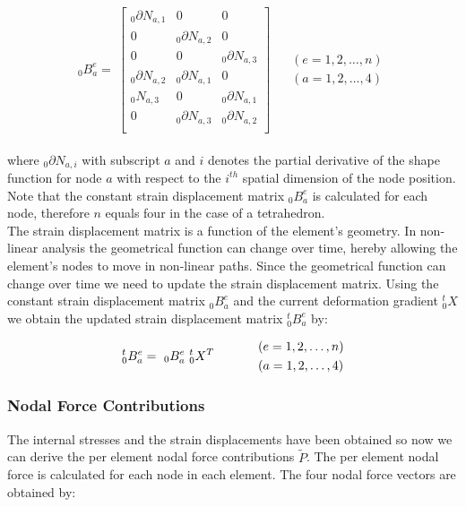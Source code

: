 \begin{equation}
_0B^{e}_{a} = \
\begin{bmatrix} 
  _0\partial N_{a,1} & 0 & 0 \\
  0 & _0\partial N_{a,2} & 0 \\
  0 & 0 & _0\partial N_{a,3} \\
  _0\partial N_{a,2} & _0\partial N_{a,1} & 0 \\
  _0N_{a,3} & 0 & _0\partial N_{a,1} \\
  0 & _0\partial N_{a,3} & _0\partial N_{a,2} \\
\end{bmatrix} 
\begin{aligned}
\ \ &(e = 1,2,\dots,n) \\
\ \ &(a = 1,2,\dots,4)
\end{aligned}
\end{equation} \\

where $_0\partial N_{a,i}$ with subscript $a$ and $i$ denotes the partial
derivative of the shape function for node $a$ with respect to the
$i^{th}$ spatial dimension of the node position. Note
that the constant strain displacement matrix $_0B^{e}_{a}$ is
calculated for each node, therefore $n$ equals four in the case of
a tetrahedron.\\  

The strain displacement matrix is a function of the element's geometry. In
non-linear analysis the geometrical function can change over time,
hereby allowing the element's nodes to move in non-linear paths.
Since the geometrical function can change over time we need to update
the strain displacement matrix. Using the constant strain displacement
matrix $_0B^{e}_{a}$ and the current deformation gradient
$^t_0X$ we obtain the updated strain displacement matrix
$^t_0B^{e}_{a}$ by:

\begin{equation}
\label{eq:strain-displacement-updated}
^t_0B^{e}_{a} = \ _0B^{e}_{a} \ ^t_0X^T
\hspace{10mm}
\begin{aligned}
\ \ &(e = 1,2,\dots,n) \\
\ \ &(a = 1,2,\dots,4)
\end{aligned}
\end{equation}

\subsubsection*{Nodal Force Contributions}
\label{sec:nodal_force_contributions}
The internal stresses and the strain displacements have been obtained so
now we can derive the per element nodal force contributions
$\tilde{P}$. The per element nodal force is calculated for each node
in each element. The four nodal force vectors are obtained by: 

